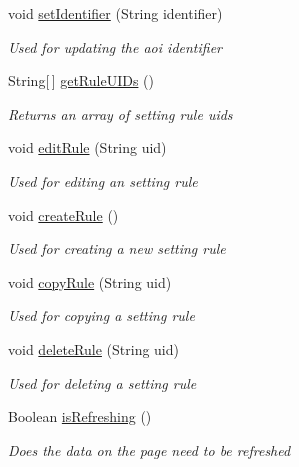 \begin{DoxyCompactItemize}
void \hyperlink{class_web_analyzer_1_1_u_i_1_1_interaction_objects_1_1_a_o_i_setting_control_a8224c2f4018a9df0dd8f485b45207844}{set\+Identifier} (String identifier)
\begin{DoxyCompactList}\small\item\em Used for updating the aoi identifier \end{DoxyCompactList}\item 
String\mbox{[}$\,$\mbox{]} \hyperlink{class_web_analyzer_1_1_u_i_1_1_interaction_objects_1_1_a_o_i_setting_control_a62223cb7bae2345f6304940012519c04}{get\+Rule\+U\+I\+Ds} ()
\begin{DoxyCompactList}\small\item\em Returns an array of setting rule uids \end{DoxyCompactList}\item 
void \hyperlink{class_web_analyzer_1_1_u_i_1_1_interaction_objects_1_1_a_o_i_setting_control_a08b6ee8feecd8783252291abdcc7e23e}{edit\+Rule} (String uid)
\begin{DoxyCompactList}\small\item\em Used for editing an setting rule \end{DoxyCompactList}\item 
void \hyperlink{class_web_analyzer_1_1_u_i_1_1_interaction_objects_1_1_a_o_i_setting_control_ad6d4cbe37d7d49b7b9a7e270fd2ad52b}{create\+Rule} ()
\begin{DoxyCompactList}\small\item\em Used for creating a new setting rule \end{DoxyCompactList}\item 
void \hyperlink{class_web_analyzer_1_1_u_i_1_1_interaction_objects_1_1_a_o_i_setting_control_a9dbae7bde830b8c7ad1f6b08c7af4235}{copy\+Rule} (String uid)
\begin{DoxyCompactList}\small\item\em Used for copying a setting rule \end{DoxyCompactList}\item 
void \hyperlink{class_web_analyzer_1_1_u_i_1_1_interaction_objects_1_1_a_o_i_setting_control_a137a5cbb5cb6d5de541a9ceba0a8e570}{delete\+Rule} (String uid)
\begin{DoxyCompactList}\small\item\em Used for deleting a setting rule \end{DoxyCompactList}\item 
Boolean \hyperlink{class_web_analyzer_1_1_u_i_1_1_interaction_objects_1_1_a_o_i_setting_control_afffc79796fc0881696d98f6b3e24bfc7}{is\+Refreshing} ()
\begin{DoxyCompactList}\small\item\em Does the data on the page need to be refreshed \end{DoxyCompactList}\end{DoxyCompactItemize}
